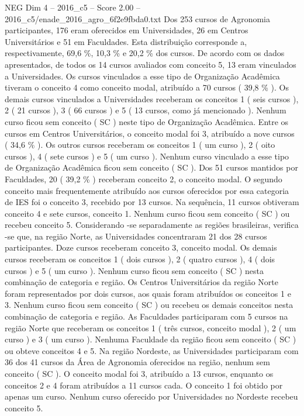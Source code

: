 \begin{textsample}{NEG Dim 4 – 2016\_c5 – Score 2.00 – 2016\_c5/enade\_2016\_agro\_6f2e9fbda0.txt}
Dos 253 cursos de Agronomia participantes, 176 eram oferecidos em Universidades, 26 em Centros Universitários e 51 em Faculdades.
Esta distribuição corresponde a, respectivamente, 69,6 \%, 10,3 \% e 20,2 \% dos cursos.
De acordo com os dados apresentados, de todos os 14 cursos avaliados com conceito 5, 13 eram vinculados a Universidades.
Os cursos vinculados a esse tipo de Organização Acadêmica tiveram o conceito 4 como conceito modal, atribuído a 70 cursos ( 39,8 \% ).
Os demais cursos vinculados a Universidades receberam os conceitos 1 ( seis cursos ), 2 ( 21 cursos ), 3 ( 66 cursos ) e 5 ( 13 cursos, como já mencionado ).
Nenhum curso ficou sem conceito ( SC ) neste tipo de Organização Acadêmica.
Entre os cursos em Centros Universitários, o conceito modal foi 3, atribuído a nove cursos ( 34,6 \% ).
Os outros cursos receberam os conceitos 1 ( um curso ), 2 ( oito cursos ), 4 ( sete cursos ) e 5 ( um curso ).
Nenhum curso vinculado a esse tipo de Organização Acadêmica ficou sem conceito ( SC ).
Dos 51 cursos mantidos por Faculdades, 20 ( 39,2 \% ) receberam conceito 2, o conceito modal.
O segundo conceito mais frequentemente atribuído aos cursos oferecidos por essa categoria de IES foi o conceito 3, recebido por 13 cursos.
Na sequência, 11 cursos obtiveram conceito 4 e sete cursos, conceito 1.
Nenhum curso ficou sem conceito ( SC ) ou recebeu conceito 5.
Considerando -se separadamente as regiões brasileiras, verifica -se que, na região Norte, as Universidades concentraram 21 dos 28 cursos participantes.
Doze cursos receberam conceito 3, conceito modal.
Os demais cursos receberam os conceitos 1 ( dois cursos ), 2 ( quatro cursos ), 4 ( dois cursos ) e 5 ( um curso ).
Nenhum curso ficou sem conceito ( SC ) nesta combinação de categoria e região.
Os Centros Universitários da região Norte foram representados por dois cursos, aos quais foram atribuídos os conceitos 1 e 3.
Nenhum curso ficou sem conceito ( SC ) ou recebeu os demais conceitos nesta combinação de categoria e região.
As Faculdades participaram com 5 cursos na região Norte que receberam os conceitos 1 ( três cursos, conceito modal ), 2 ( um curso ) e 3 ( um curso ).
Nenhuma Faculdade da região ficou sem conceito ( SC ) ou obteve conceitos 4 e 5.
Na região Nordeste, as Universidades participaram com 36 dos 41 cursos da Área de Agronomia oferecidos na região, nenhum sem conceito ( SC ).
O conceito modal foi 3, atribuído a 13 cursos, enquanto os conceitos 2 e 4 foram atribuídos a 11 cursos cada.
O conceito 1 foi obtido por apenas um curso.
Nenhum curso oferecido por Universidades no Nordeste recebeu conceito 5.

\end{textsample}
